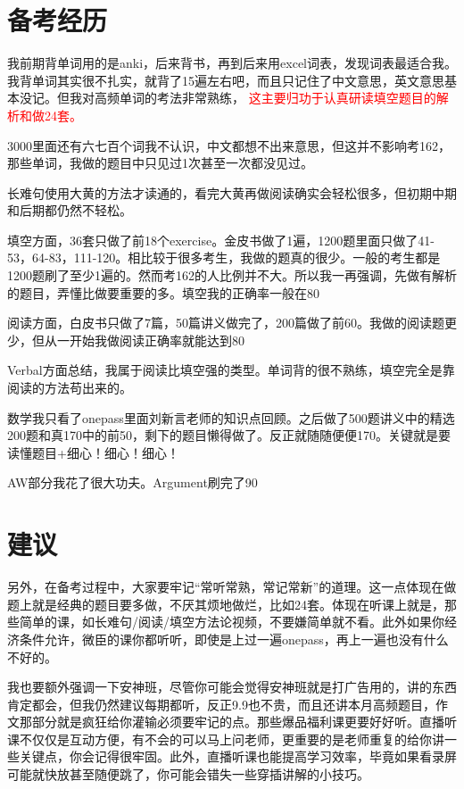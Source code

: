 \documentclass[11pt,a4paper]{article}
\begin{document}
{{{		\section*{备考经历}
			我前期背单词用的是anki，后来背书，再到后来用excel词表，发现词表最适合我。我背单词其实很不扎实，就背了15遍左右吧，而且只记住了中文意思，英文意思基本没记。但我对高频单词的考法非常熟练，
			\textcolor{red}{这主要归功于认真研读填空题目的解析和做24套。}
			
			3000里面还有六七百个词我不认识，中文都想不出来意思，但这并不影响考162，那些单词，我做的题目中只见过1次甚至一次都没见过。
			
			长难句使用大黄的方法才读通的，看完大黄再做阅读确实会轻松很多，但初期中期和后期都仍然不轻松。
			
			填空方面，36套只做了前18个exercise。金皮书做了1遍，1200题里面只做了41-53，64-83，111-120。相比较于很多考生，我做的题真的很少。一般的考生都是1200题刷了至少1遍的。然而考162的人比例并不大。所以我一再强调，先做有解析的题目，弄懂比做要重要的多。填空我的正确率一般在80%
			
			阅读方面，白皮书只做了7篇，50篇讲义做完了，200篇做了前60。我做的阅读题更少，但从一开始我做阅读正确率就能达到80%
			
			Verbal方面总结，我属于阅读比填空强的类型。单词背的很不熟练，填空完全是靠阅读的方法苟出来的。
		
			数学我只看了onepass里面刘新言老师的知识点回顾。之后做了500题讲义中的精选200题和真170中的前50，剩下的题目懒得做了。反正就随随便便170。关键就是要读懂题目+细心！细心！细心！
		
			AW部分我花了很大功夫。Argument刷完了90%
		
		\newpage
		\section*{建议}
			另外，在备考过程中，大家要牢记“常听常熟，常记常新”的道理。这一点体现在做题上就是经典的题目要多做，不厌其烦地做烂，比如24套。体现在听课上就是，那些简单的课，如长难句/阅读/填空方法论视频，不要嫌简单就不看。此外如果你经济条件允许，微臣的课你都听听，即使是上过一遍onepass，再上一遍也没有什么不好的。
		
			我也要额外强调一下安神班，尽管你可能会觉得安神班就是打广告用的，讲的东西肯定都会，但我仍然建议每期都听，反正9.9也不贵，而且还讲本月高频题目，作文那部分就是疯狂给你灌输必须要牢记的点。那些爆品福利课更要好好听。直播听课不仅仅是互动方便，有不会的可以马上问老师，更重要的是老师重复的给你讲一些关键点，你会记得很牢固。此外，直播听课也能提高学习效率，毕竟如果看录屏可能就快放甚至随便跳了，你可能会错失一些穿插讲解的小技巧。
		
}}}
\end{document}
